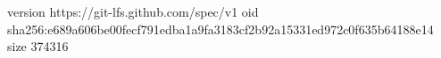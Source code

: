 version https://git-lfs.github.com/spec/v1
oid sha256:e689a606be00fecf791edba1a9fa3183cf2b92a15331ed972c0f635b64188e14
size 374316
